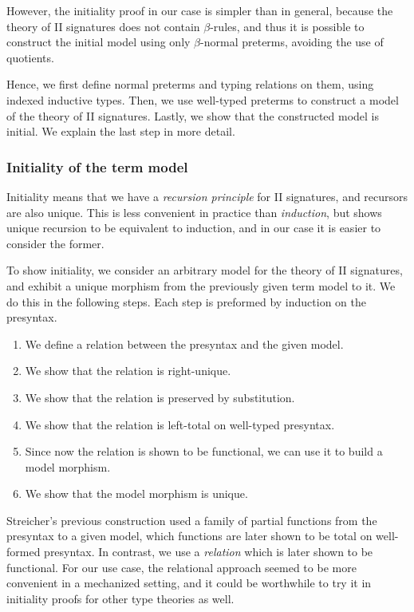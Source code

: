 However, the initiality proof in our case is simpler than in general, because
the theory of II signatures does not contain $\beta$-rules, and thus it is
possible to construct the initial model using only $\beta$-normal preterms,
avoiding the use of quotients.

Hence, we first define normal preterms and typing relations on them, using indexed
inductive types. Then, we use well-typed preterms to construct a model of the theory
of II signatures. Lastly, we show that the constructed model is initial. We explain
the last step in more detail.

\subsubsection*{Initiality of the term model}

Initiality means that we have a \emph{recursion principle} for II signatures,
and recursors are also unique. This is less convenient in practice than
\emph{induction}, but \cite{qiit} shows unique recursion to be equivalent to
induction, and in our case it is easier to consider the former.

To show initiality, we consider an arbitrary model for the theory of II
signatures, and exhibit a unique morphism from the previously given term model
to it. We do this in the following steps. Each step is preformed by induction on
the presyntax.

\begin{enumerate}
  \item We define a relation between the presyntax and the given model.
  \item We show that the relation is right-unique.
  \item We show that the relation is preserved by substitution.
  \item We show that the relation is left-total on well-typed presyntax.
  \item Since now the relation is shown to be functional, we can use it to
        build a model morphism.
  \item We show that the model morphism is unique.
\end{enumerate}

Streicher's previous construction \cite{streicher2012semantics} used a family of
partial functions from the presyntax to a given model, which functions are later
shown to be total on well-formed presyntax. In contrast, we use a
\emph{relation} which is later shown to be functional. For our use case, the
relational approach seemed to be more convenient in a mechanized setting, and it
could be worthwhile to try it in initiality proofs for other type theories as
well.

